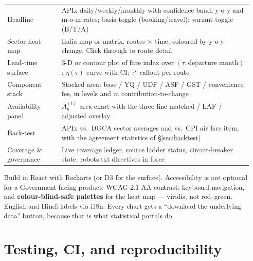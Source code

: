 \begin{center}
\footnotesize
\begin{tabularx}{\textwidth}{@{}L{3.6cm} X@{}}
\toprule
{} &  \\
\midrule
Headline & APIx daily/weekly/monthly with confidence band; y-o-y and m-o-m rates; basis toggle (booking/travel); variant toggle (B/T/A) \\
Sector heat map & India map or matrix, routes $\times$ time, coloured by y-o-y change. Click through to route detail \\
Lead-time surface & 3-D or contour plot of fare index over $(\tau,\text{departure month})$; $\eta(\tau)$ curve with CI; $\tau^\star$ callout per route \\
Component stack & Stacked area: base / YQ / UDF / ASF / GST / convenience fee, in levels and in contribution-to-change \\
Availability panel & $A_g^{(t)}$ area chart with the three-line matched / LAF / adjusted overlay \\
Back-test & APIx vs.\ DGCA sector averages and vs.\ CPI air fare item, with the agreement statistics of \S\ref{sec:backtest} \\
Coverage \& governance & Live coverage ledger, source ladder status, circuit-breaker state, robots.txt directives in force \\
\bottomrule
\end{tabularx}
\end{center}

\noindent Build in React with Recharts (or D3 for the surface). Accessibility is not
optional for a Government-facing product: WCAG 2.1 AA contrast, keyboard navigation, and
\textbf{colour-blind-safe palettes} for the heat map --- viridis, not red--green. English and
Hindi labels via i18n. Every chart gets a ``download the underlying data'' button, because
that is what statistical portals do.

\section{Testing, CI, and reproducibility}

